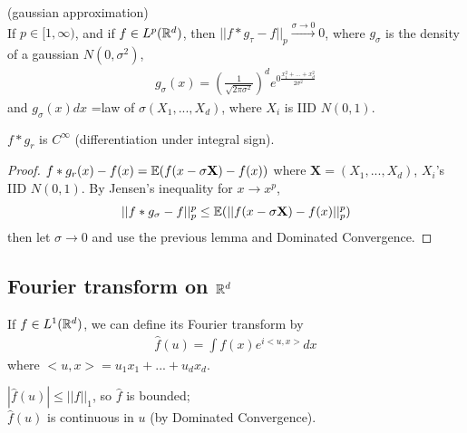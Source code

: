 \documentclass[a4paper]{article}
\begin{document}
\begin{lemma} (gaussian approximation)\\
If $p \in [1,\infty)$, and if $f \in L^p(\mathbb{R}^d)$, then $||f*g_\tau - f||_p \xrightarrow{\sigma \to 0} 0$, where $g_\sigma$ is the density of a gaussian $N(0,\sigma^2)$,
\begin{equation*}
\begin{aligned}
g_\sigma(x) = (\frac{1}{\sqrt{2\pi \sigma^2}})^d e^{0\frac{x_1^2+...+x_d^2}{2\sigma^2}}
\end{aligned}
\end{equation*}
and $g_\sigma(x) dx$ =law of $\sigma(X_1,...,X_d)$, where $X_i$ is IID $N(0,1)$.

\begin{rem}
$f*g_r$ is $C^\infty$ (differentiation under integral sign).
\end{rem}

\begin{proof}
$f*g_r(x) - f(x) = \mathbb{E}(f(x-\sigma\mathbf{X}) - f(x))$ where $\mathbf{X} = (X_1,...,X_d)$, $X_i$'s IID $N(0,1)$. By Jensen's inequality for $x \to x^p$,
\begin{equation*}
\begin{aligned}
||f*g_\sigma-f||_p^p \leq \mathbb{E}(||f(x-\sigma\mathbf{X}) - f(x)||_p^p)
\end{aligned}
\end{equation*}
then let $\sigma \to 0$ and use the previous lemma and Dominated Convergence.
\end{proof}
\end{lemma}

\subsection{Fourier transform on $\mathbb{R}^d$}

\begin{defi}
If $f \in L^1(\mathbb{R}^d)$, we can define its Fourier transform by
\begin{equation*}
\begin{aligned}
\hat{f}(u) = \int f(x) e^{i<u,x>} dx
\end{aligned}
\end{equation*}
where $<u,x> = u_1x_1+...+u_dx_d$.
\end{defi}

\begin{rem}
$|\hat{f}(u)| \leq ||f||_1$, so $\hat{f}$ is bounded;\\
$\hat{f}(u)$ is continuous in $u$ (by Dominated Convergence).
\end{rem}
\end{document}
